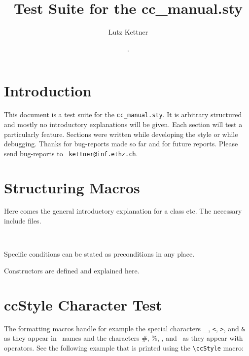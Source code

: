 \documentclass[12pt]{article}
\title {Test Suite for the cc\_manual.sty}
\author{Lutz Kettner}
\date{\ccRevision. \ccDate}
\begin{document}
\maketitle

\section{Introduction}

This document is a test suite for the {\tt cc\_manual.sty}. It is
arbitrary structured and mostly no introductory explanations will be given.
Each section will test a particularly feature. Sections were written
while developing the style or while debugging. Thanks for bug-reports
made so far and for future reports. Please send bug-reports to {\tt
  kettner@inf.ethz.ch}.


\section{Structuring Macros}

\ccDefinition Here comes the general introductory explanation for a
class etc. The necessary include files.

\\

\ccAccessFunctions

\ccPrecond Specific conditions can be stated as preconditions in any place.

\ccCreation Constructors are defined and explained here.

\section{ccStyle Character Test}

The formatting macros handle for example the special characters \_,
{\tt <}, {\tt >}, and {\tt \&} as they appear in \CC\ names and the
characters \#, \%, \ccHat, and \ccTilde\ as they appear with
operators. See the following example that is printed using the
\verb+\cc+{\tt Style} macro:
\end{document}
